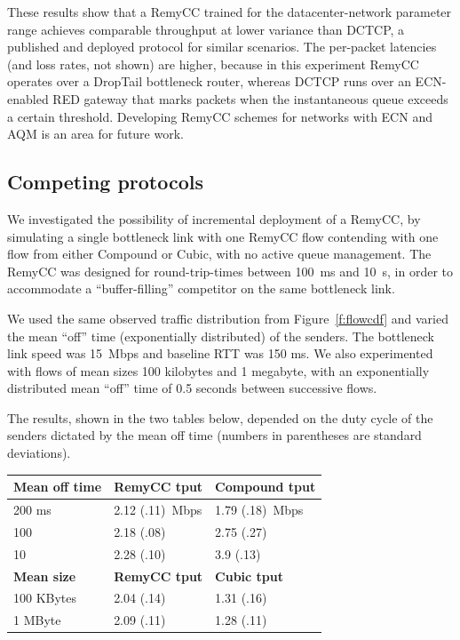 These results show that a RemyCC trained for the datacenter-network
parameter range achieves comparable throughput at lower variance than
DCTCP, a published and deployed protocol for similar scenarios. The
per-packet latencies (and loss rates, not shown) are higher, because
in this experiment RemyCC operates over a DropTail bottleneck router,
whereas DCTCP runs over an ECN-enabled RED gateway that marks packets
when the instantaneous queue exceeds a certain threshold. Developing
RemyCC schemes for networks with ECN and AQM is an area for future
work.

\subsection{Competing protocols}

We investigated the possibility of incremental deployment of a RemyCC,
by simulating a single bottleneck link with one RemyCC flow contending
with one flow from either Compound or Cubic, with no active queue
management. The RemyCC was designed for round-trip-times between
100~ms and 10~s, in order to accommodate a ``buffer-filling''
competitor on the same bottleneck link.

We used the same observed traffic distribution from
Figure~\ref{f:flowcdf} and varied the mean ``off'' time (exponentially
distributed) of the senders.  The bottleneck link speed was 15~Mbps
and baseline RTT was 150 ms. We also experimented with flows of mean
sizes 100 kilobytes and 1 megabyte, with an exponentially distributed mean
``off'' time of 0.5 seconds between successive flows. 

The results, shown in the two tables below, depended on the duty cycle
of the senders dictated by the mean off time (numbers in parentheses
are standard deviations).

\vspace{\baselineskip}


\begin{tabular}{lll}
\bf Mean off time & \bf RemyCC tput & \bf Compound tput \\
\hline 200 ms & 2.12 (.11)~Mbps & 1.79 (.18)~Mbps \\
100 & 2.18 (.08)  & 2.75 (.27)\\
10 & 2.28 (.10) & 3.9 (.13) \\
\hline
\bf Mean size & \bf RemyCC tput & \bf Cubic tput \\
100 KBytes & 2.04 (.14) & 1.31 (.16)\\
1 MByte & 2.09 (.11) & 1.28 (.11) \\
\hline
\end{tabular}


